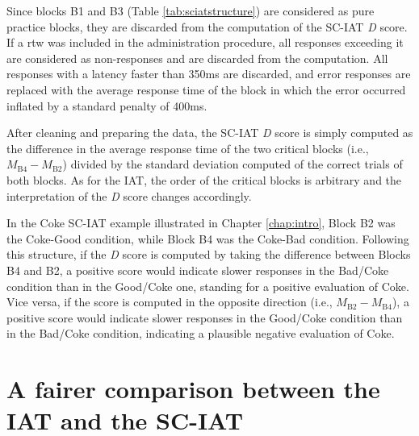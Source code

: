 \documentclass[12pt]{book}
\begin{document}
Since blocks B1 and B3 (Table \ref{tab:sciatstructure}) are considered as pure practice blocks, they are discarded from the computation of the SC-IAT \emph{D} score. If a rtw was included in the administration procedure, all responses exceeding it are considered as non-responses and are discarded from the computation. All responses with a latency faster than 350ms are discarded, and error responses are replaced with the average response time of the block in which the error occurred inflated by a standard penalty of 400ms. 

After cleaning and preparing the data, the SC-IAT \emph{D} score is simply computed as the difference in the average response time of the two critical blocks (i.e., $M_{\text{B4}} - M_{\text{B2}}$) divided by the standard deviation computed of the correct trials of both blocks. As for the IAT, the order of the critical blocks is arbitrary and the interpretation of the \emph{D} score changes accordingly. 

In the Coke SC-IAT example illustrated in Chapter \ref{chap:intro}, Block B2 was the Coke-Good condition, while Block B4 was the Coke-Bad condition.
Following this structure, if the \emph{D} score is computed by taking the difference between Blocks B4 and B2, a positive score would indicate slower responses in the Bad/Coke condition than in the Good/Coke one, standing for a positive evaluation of Coke. Vice versa, if the score is computed in the opposite direction (i.e., $M_{\text{B2}} - M_{\text{B4}}$), a positive score would indicate slower responses in the Good/Coke condition than in the Bad/Coke condition, indicating a plausible negative evaluation of Coke. 


\section[A fairer comparison]{A fairer comparison between the IAT and the SC-IAT}
\end{document}
